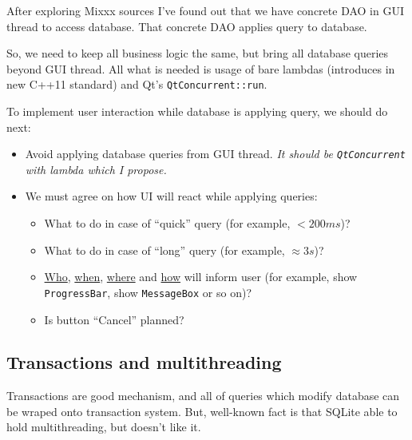 \documentclass[a4paper,12pt]{scrartcl}
\begin{document}
After exploring Mixxx sources I've found out that we have concrete DAO in GUI thread to access database. 
That concrete DAO applies query to database.

So, we need to keep all business logic the same, but bring all database queries beyond GUI thread. 
All what is needed is usage of bare lambdas (introduces in new C++11 standard) and Qt's \texttt{QtConcurrent::run}.

To implement user interaction while database is applying query, we should do next:
\begin{itemize}
 \item Avoid applying database queries from GUI thread. \textit{It should be \texttt{QtConcurrent} with 
    lambda which I propose.}
 \item We must agree on how UI will react while applying queries:
 \begin{itemize}
  \item What to do in case of ``quick'' query (for example, $< 200 ms$)?
  \item What to do in case of ``long'' query (for example, $\approx 3 s$)?
  \item \underline{Who}, \underline{when}, \underline{where} and \underline{how} will inform user 
    (for example, show \texttt{ProgressBar}, show \texttt{MessageBox} or so on)?
  \item Is button ``Cancel'' planned?
 \end{itemize}
\end{itemize}

\subsection{Transactions and multithreading}
Transactions are good mechanism, and all of queries which modify database can be wraped onto transaction 
system. But, well-known fact is that SQLite able to hold multithreading, but doesn't like it.
\end{document}
